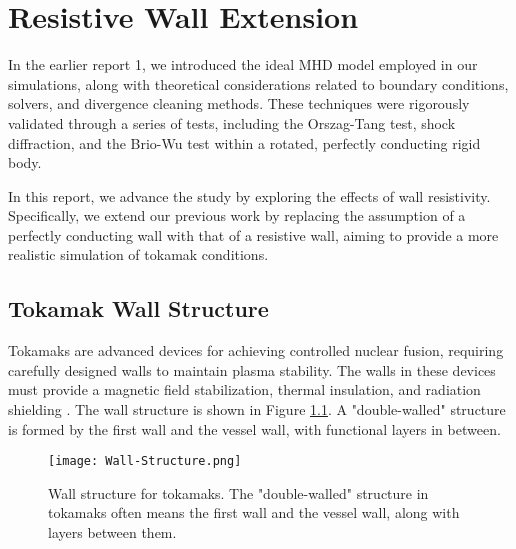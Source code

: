 
\chapter{Resistive Wall Extension} %

\ifpdf
\graphicspath{{Chapter6/Figs/Raster/}{Chapter6/Figs/PDF/}{Chapter6/Figs/}}
\else
\graphicspath{{Chapter6/Figs/Vector/}{Chapter6/Figs/}}
\fi

\label{chapter 6}

In the earlier report 1, we introduced the ideal MHD model employed in our simulations, along with theoretical considerations related to boundary conditions, solvers, and divergence cleaning methods. These techniques were rigorously validated through a series of tests, including the Orszag-Tang test, shock diffraction, and the Brio-Wu test within a rotated, perfectly conducting rigid body.

In this report, we advance the study by exploring the effects of wall resistivity. Specifically, we extend our previous work by replacing the assumption of a perfectly conducting wall with that of a resistive wall, aiming to provide a more realistic simulation of tokamak conditions.

\section{Tokamak Wall Structure}
\label{section6.1}
Tokamaks are advanced devices for achieving controlled nuclear fusion, requiring carefully designed walls to maintain plasma stability. The walls in these devices must provide a magnetic field stabilization, thermal insulation, and radiation shielding \cite{wesson2011tokamaks}. The wall structure is shown in Figure \ref{fig:wallstructure}. A "double-walled" structure is formed by the first wall and the vessel wall, with functional layers in between.  

\begin{figure}[htbp]
	\centering
	\texttt{[image: Wall-Structure.png]}
	\caption[Wall Structure for Tokamaks]{Wall structure for tokamaks. The "double-walled" structure in tokamaks often means the first wall and the vessel wall, along with layers between them.}
	\label{fig:wallstructure}
\end{figure}

